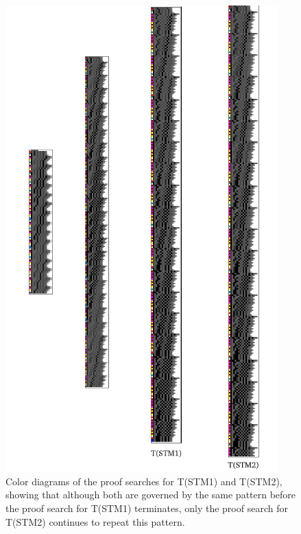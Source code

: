 \documentclass[%
  manuscript=article,   %
  year=2024,
  volume=77,
  doi=10.59203/zfn.77.694,
]{zfn}
\begin{document}
\begin{figure}
    \centering
    \includegraphics[width=10.5cm]{ART_Lampert/STM12tableauxtotal.png}
\caption{Color diagrams of the proof searches for T(STM1) and T(STM2),
showing that although both are governed by the same pattern before the proof search for T(STM1) terminates, only the proof search for T(STM2) continues to repeat this pattern.}
    \label{STM12skolem}
\end{figure}
\end{document}
